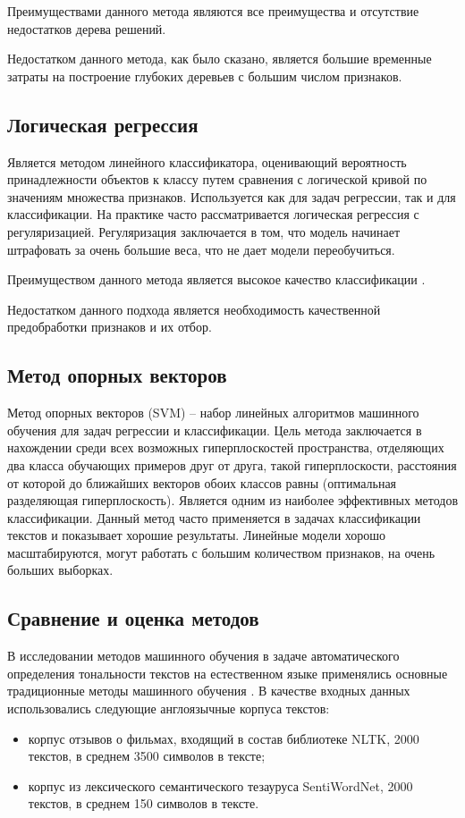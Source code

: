 \documentclass[a4paper,14pt, unknownkeysallowed]{extreport}
\begin{document}
	Преимуществами данного метода являются все преимущества и отсутствие недостатков дерева решений.
	
	Недостатком данного метода, как было сказано, является большие временные затраты на построение глубоких деревьев с большим числом признаков.
	
	\subsection{Логическая регрессия}
	
	Является методом линейного классификатора, оценивающий вероятность принадлежности объектов к классу путем сравнения с логической кривой по значениям множества признаков. Используется как для задач регрессии, так и для классификации. На практике часто рассматривается логическая регрессия с регуляризацией. Регуляризация заключается в том, что модель начинает штрафовать за очень большие веса, что не дает модели переобучиться. 
	
	Преимуществом данного метода является высокое качество классификации \cite{Samigulin}. 
	
	Недостатком данного подхода является необходимость качественной предобработки признаков и их отбор.

	\subsection{Метод опорных векторов}
	
	Метод опорных векторов (SVM) -- набор линейных алгоритмов машинного обучения для задач регрессии и классификации. Цель метода заключается в нахождении среди всех возможных гиперплоскостей пространства, отделяющих два класса обучающих примеров друг от друга, такой гиперплоскости, расстояния от которой до ближайших векторов обоих классов равны (оптимальная разделяющая гиперплоскость). Является одним из наиболее эффективных методов классификации. Данный метод часто применяется в задачах классификации текстов и показывает хорошие результаты. Линейные модели хорошо масштабируются, могут работать с большим количеством признаков, на очень больших выборках. 
	
	\subsection{Сравнение и оценка методов}

	В исследовании методов машинного обучения в задаче автоматического определения тональности текстов на естественном языке применялись основные традиционные методы машинного обучения \cite{Samigulin}. В качестве входных данных использовались следующие англоязычные корпуса текстов:
	\begin{itemize}
		\item корпус отзывов о фильмах, входящий в состав библиотеке NLTK, 2000 текстов, в среднем 3500 символов в тексте;
		\item корпус из лексического семантического тезауруса SentiWordNet, 2000 текстов, в среднем 150 символов в тексте.
	\end{itemize}
\end{document}
